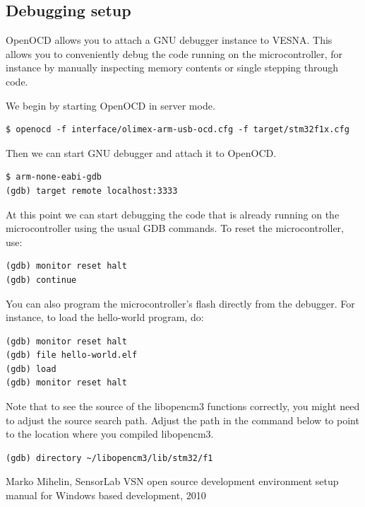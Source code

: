 \documentclass[a4paper, 10pt]{article}
\begin{document}
\subsection{Debugging setup}

OpenOCD allows you to attach a GNU debugger instance to VESNA. This allows you
to conveniently debug the code running on the microcontroller, for instance by
manually inspecting memory contents or single stepping through code.

We begin by starting OpenOCD in server mode.

\begin{verbatim}
$ openocd -f interface/olimex-arm-usb-ocd.cfg -f target/stm32f1x.cfg
\end{verbatim}

Then we can start GNU debugger and attach it to OpenOCD.

\begin{verbatim}
$ arm-none-eabi-gdb
(gdb) target remote localhost:3333
\end{verbatim}

At this point we can start debugging the code that is already running on the
microcontroller using the usual GDB commands. To reset the microcontroller, use:

\begin{verbatim}
(gdb) monitor reset halt
(gdb) continue
\end{verbatim}

You can also program the microcontroller's flash directly from the debugger. For
instance, to load the hello-world program, do:

\begin{verbatim}
(gdb) monitor reset halt
(gdb) file hello-world.elf
(gdb) load
(gdb) monitor reset halt
\end{verbatim}

Note that to see the source of the libopencm3 functions correctly, you might
need to adjust the source search path. Adjust the path in the command below to
point to the location where you compiled libopencm3.

\begin{verbatim}
(gdb) directory ~/libopencm3/lib/stm32/f1
\end{verbatim}

\newpage

\begin{thebibliography}{9}
   Marko Mihelin, SensorLab VSN open source development environment setup manual for Windows based development,
   2010

\end{thebibliography}
\end{document}
